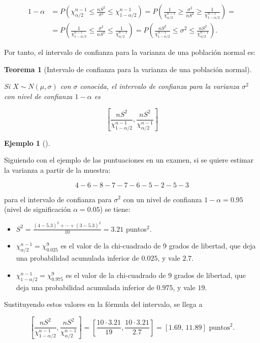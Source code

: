 \documentclass[
  a4paper,
]{scrreport}
\providecommand{\tightlist}{%
  \setlength{\itemsep}{0pt}\setlength{\parskip}{0pt}}\usepackage{longtable,booktabs,array}
\theoremstyle{plain}
\newtheorem{theorem}{Teorema}[chapter]
\theoremstyle{definition}
\newtheorem{example}{Ejemplo}[chapter]
\theoremstyle{definition}
\theoremstyle{remark}
\begin{document}
\begin{align*}
1-\alpha &= P\left(\chi^{n-1}_{\alpha/2}\leq \frac{nS^2}{\sigma^2}  \leq \chi^{n-1}_{1-\alpha/2}\right) =
P\left(\frac{1}{\chi^{n-1}_{\alpha/2}}\geq \frac{\sigma^2}{nS^2}  \geq \frac{1}{\chi^{n-1}_{1-\alpha/2}}\right)=\\
&= P\left(\frac{1}{\chi^{n-1}_{1-\alpha/2}}\leq \frac{\sigma^2}{nS^2}  \leq \frac{1}{\chi^{n-1}_{\alpha/2}}\right)
= P\left(\frac{nS^2}{\chi^{n-1}_{1-\alpha/2}}\leq \sigma^2  \leq \frac{nS^2}{\chi^{n-1}_{\alpha/2}}\right).
\end{align*}

Por tanto, el intervalo de confianza para la varianza de una población
normal es:

\begin{theorem}[Intervalo de confianza para la varianza de una población
normal]\protect\hypertarget{thm-intervalo-confianza-varianza-normal}{}\label{thm-intervalo-confianza-varianza-normal}

Si \(X\sim N(\mu, \sigma)\) con \(\sigma\) conocida, el \emph{intervalo
de confianza para la varianza} \(\sigma^2\) con nivel de confianza
\(1-\alpha\) es

\[
\left[\frac{nS^2}{\chi^{n-1}_{1-\alpha/2}},\frac{nS^2}{\chi^{n-1}_{\alpha/2}}\right]
\]

\end{theorem}

\begin{example}[]\protect\hypertarget{exm-intervalo-confianza-varianza-normal}{}\label{exm-intervalo-confianza-varianza-normal}

Siguiendo con el ejemplo de las puntuaciones en un examen, si se quiere
estimar la varianza a partir de la muestra:

\[
4 - 6 - 8 - 7 - 7 - 6 - 5 - 2 - 5 - 3
\]

para el intervalo de confianza para \(\sigma^2\) con un nivel de
confianza \(1-\alpha=0.95\) (nivel de significación \(\alpha=0.05\)) se
tiene:

\begin{itemize}
\tightlist
\item
  \(S^2= \frac{(4-5.3)^2+\cdots+(3-5.3)^2}{10} = 3.21\) puntos\(^2\).
\item
  \(\chi^{n-1}_{\alpha/2}=\chi^9_{0.025}\) es el valor de la
  chi-cuadrado de 9 grados de libertad, que deja una probabilidad
  acumulada inferior de \(0.025\), y vale \(2.7\).
\item
  \(\chi^{n-1}_{1-\alpha/2}=\chi^9_{0.975}\) es el valor de la
  chi-cuadrado de 9 grados de libertad, que deja una probabilidad
  acumulada inferior de \(0.975\), y vale \(19\).
\end{itemize}

Sustituyendo estos valores en la fórmula del intervalo, se llega a

\[
\left[\frac{nS^2}{\chi^{n-1}_{1-\alpha/2}},\frac{nS^2}{\chi^{n-1}_{\alpha/2}}\right] =
\left[\frac{10\cdot 3.21}{19},\frac{10\cdot 3.21}{2.7}\right] = [1.69,\,11.89] \text{ puntos}^2.
\]

\end{example}
\end{document}
